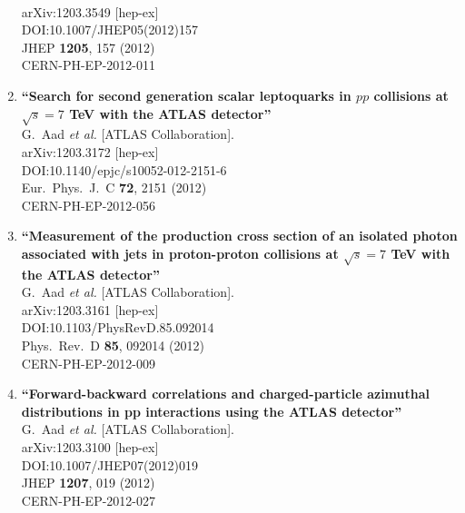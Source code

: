 \documentclass{article}
\begin{document}
\begin{enumerate}
  \\{}arXiv:1203.3549 [hep-ex]
  \\{}DOI:10.1007/JHEP05(2012)157
  \\{}JHEP {\bf 1205}, 157 (2012)
  \\{}CERN-PH-EP-2012-011
\item%
{\bf ``Search for second generation scalar leptoquarks in $pp$ collisions at $\sqrt{s}=7$ TeV with the ATLAS detector''}
  \\{}G.~Aad {\it et al.} [ATLAS Collaboration].
  \\{}arXiv:1203.3172 [hep-ex]
  \\{}DOI:10.1140/epjc/s10052-012-2151-6
  \\{}Eur.\ Phys.\ J.\ C {\bf 72}, 2151 (2012)
  \\{}CERN-PH-EP-2012-056
\item%
{\bf ``Measurement of the production cross section of an isolated photon associated with jets in proton-proton collisions at $\sqrt{s}=7$ TeV with the ATLAS detector''}
  \\{}G.~Aad {\it et al.} [ATLAS Collaboration].
  \\{}arXiv:1203.3161 [hep-ex]
  \\{}DOI:10.1103/PhysRevD.85.092014
  \\{}Phys.\ Rev.\ D {\bf 85}, 092014 (2012)
  \\{}CERN-PH-EP-2012-009
\item%
{\bf ``Forward-backward correlations and charged-particle azimuthal distributions in pp interactions using the ATLAS detector''}
  \\{}G.~Aad {\it et al.} [ATLAS Collaboration].
  \\{}arXiv:1203.3100 [hep-ex]
  \\{}DOI:10.1007/JHEP07(2012)019
  \\{}JHEP {\bf 1207}, 019 (2012)
  \\{}CERN-PH-EP-2012-027

\end{enumerate}
\end{document}
